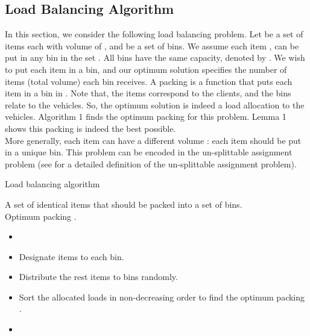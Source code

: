 \subsection{Load Balancing Algorithm}
\noindent In this section, we consider the following load balancing problem. Let  be a set of items each with volume of , and  be a set of bins. We assume each item ,  can be put in any bin in the set . All bins have the same capacity, denoted by . We wish to put each item in a bin, and our optimum solution   specifies the number of items (total volume) each bin  receives. A packing is a function  that puts each item  in a bin in . Note that, the items correspond to the clients, and the bins relate to the vehicles. So, the optimum solution  is indeed a load allocation to the  vehicles. Algorithm 1 finds the optimum packing for this problem. Lemma 1 shows this packing is indeed the best possible.\\
\indent More generally, each item  can have a different volume : each item should be put in a unique bin. This problem can be encoded in the un-splittable assignment problem (see \cite{Lenstra} for a detailed definition of the un-splittable assignment problem). \\


\begin{algorithm}

\caption{Load balancing algorithm}

 A set of  identical items that should be packed into a set of  bins.\\
 Optimum packing .
\begin{itemize}
\item[]  
\item[] Designate  items to each bin.

\item[] Distribute the rest items to  bins randomly. 

\item[] Sort the allocated loads in non-decreasing order to find the optimum packing .
\item[] 
\end{itemize}

\end{algorithm}

